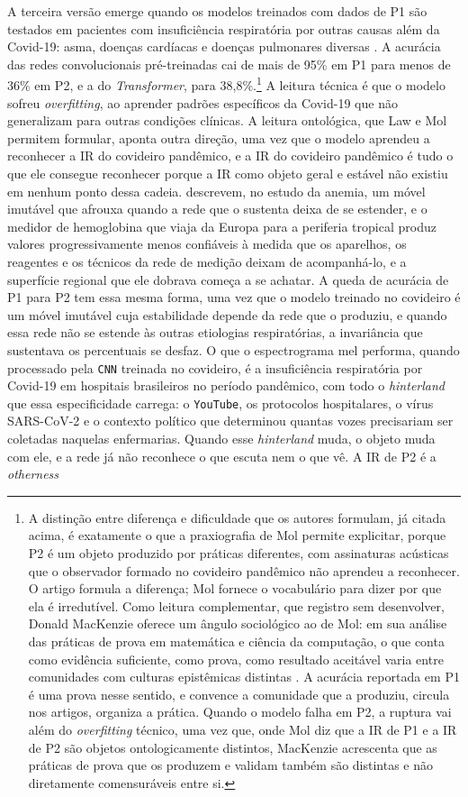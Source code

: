 A terceira versão emerge quando os modelos treinados com dados de P1 são testados em pacientes com insuficiência respiratória por outras causas além da Covid-19: asma, doenças cardíacas e doenças pulmonares diversas \parencite{Gauy2024Discriminant}. A acurácia das redes convolucionais pré-treinadas cai de mais de 95\% em P1 para menos de 36\% em P2, e a do \textit{Transformer}, para 38,8\%.\footnote{A distinção entre diferença e dificuldade que os autores formulam, já citada acima, é exatamente o que a praxiografia de Mol permite explicitar, porque P2 é um objeto produzido por práticas diferentes, com assinaturas acústicas que o observador formado no covideiro pandêmico não aprendeu a reconhecer. O artigo formula a diferença; Mol fornece o vocabulário para dizer por que ela é irredutível. Como leitura complementar, que registro sem desenvolver, Donald MacKenzie oferece um ângulo sociológico ao de Mol: em sua análise das práticas de prova em matemática e ciência da computação, o que conta como evidência suficiente, como prova, como resultado aceitável varia entre comunidades com culturas epistêmicas distintas \parencite{Mackenzie1990Inventing}. A acurácia reportada em P1 é uma prova nesse sentido, e convence a comunidade que a produziu, circula nos artigos, organiza a prática. Quando o modelo falha em P2, a ruptura vai além do \textit{overfitting} técnico, uma vez que, onde Mol diz que a IR de P1 e a IR de P2 são objetos ontologicamente distintos, MacKenzie acrescenta que as práticas de prova que os produzem e validam também são distintas e não diretamente comensuráveis entre si.} A leitura técnica é que o modelo sofreu \textit{overfitting}, ao aprender padrões específicos da Covid-19 que não generalizam para outras condições clínicas. A leitura ontológica, que Law e Mol permitem formular, aponta outra direção, uma vez que o modelo aprendeu a reconhecer a IR do covideiro pandêmico, e a IR do covideiro pandêmico é tudo o que ele consegue reconhecer porque a IR como objeto geral e estável não existiu em nenhum ponto dessa cadeia. \textcite{MolLaw1994} descrevem, no estudo da anemia, um móvel imutável que afrouxa quando a rede que o sustenta deixa de se estender, e o medidor de hemoglobina que viaja da Europa para a periferia tropical produz valores progressivamente menos confiáveis à medida que os aparelhos, os reagentes e os técnicos da rede de medição deixam de acompanhá-lo, e a superfície regional que ele dobrava começa a se achatar. A queda de acurácia de P1 para P2 tem essa mesma forma, uma vez que o modelo treinado no covideiro é um móvel imutável cuja estabilidade depende da rede que o produziu, e quando essa rede não se estende às outras etiologias respiratórias, a invariância que sustentava os percentuais se desfaz. O que o espectrograma mel performa, quando processado pela \texttt{CNN} treinada no covideiro, é a insuficiência respiratória por Covid-19 em hospitais brasileiros no período pandêmico, com todo o \textit{hinterland} que essa especificidade carrega: o \texttt{YouTube}, os protocolos hospitalares, o vírus SARS-CoV-2 e o contexto político que determinou quantas vozes precisariam ser coletadas naquelas enfermarias. Quando esse \textit{hinterland} muda, o objeto muda com ele, e a rede já não reconhece o que escuta nem o que vê. A IR de P2 é a \textit{otherness} 